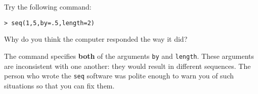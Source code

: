 
Try the following command:
\begin{verbatim}
> seq(1,5,by=.5,length=2)
\end{verbatim}
Why do you think the computer responded the way it did?
\TextEntry

\begin{AnswerText}
The command specifies {\bf both} of the arguments \texttt{by} and
\texttt{length}.  These arguments are inconsistent with one another:
they would result in different sequences.
The person who wrote the \texttt{seq} software was polite enough to
warn you of such situations so that you can fix them.
\end{AnswerText}

